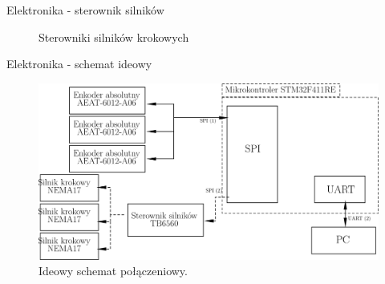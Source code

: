 \documentclass{beamer}
\begin{document}
\begin{frame}{Elektronika - sterownik silników}
	
	\begin{figure}%
		\centering
		\qquad
		\caption{Sterowniki silników krokowych}
		\label{fig:sterownik:porownanie}%
		
	\end{figure}
\end{frame}

\begin{frame}{Elektronika - schemat ideowy}
	
	\begin{figure}[h]
		\centering
		\includegraphics[height=0.6\textheight]{img/core_agent_hardware_schematics.png}
		\caption{Ideowy schemat połączeniowy.}
		\label{ros:schemat-elektronika}
	\end{figure}
	
\end{frame}
\end{document}
